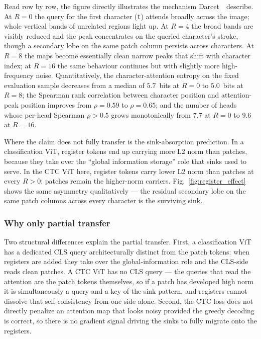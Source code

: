 Read row by row, the figure directly illustrates the mechanism Darcet~\etal\ describe. At $R = 0$ the query for the first character (\texttt{t}) attends broadly across the image; whole vertical bands of unrelated regions light up. At $R = 4$ the broad bands are visibly reduced and the peak concentrates on the queried character's stroke, though a secondary lobe on the same patch column persists across characters. At $R = 8$ the maps become essentially clean narrow peaks that shift with character index; at $R = 16$ the same behaviour continues but with slightly more high-frequency noise. Quantitatively, the character-attention entropy on the fixed evaluation sample decreases from a median of $5.7$~bits at $R = 0$ to $5.0$~bits at $R = 8$; the Spearman rank correlation between character position and attention-peak position improves from $\rho = 0.59$ to $\rho = 0.65$; and the number of heads whose per-head Spearman $\rho > 0.5$ grows monotonically from $7.7$ at $R = 0$ to $9.6$ at $R = 16$.

Where the claim does not fully transfer is the sink-absorption prediction. In a classification ViT, register tokens end up carrying more L2 norm than patches, because they take over the ``global information storage'' role that sinks used to serve. In the CTC ViT here, register tokens carry lower L2 norm than patches at every $R > 0$: patches remain the higher-norm carriers. Fig.~\ref{fig:register_effect} shows the same asymmetry qualitatively --- the residual secondary lobe on the same patch columns across every character is the surviving sink.

\subsubsection{Why only partial transfer}

Two structural differences explain the partial transfer. First, a classification ViT has a dedicated CLS query architecturally distinct from the patch tokens: when registers are added they take over the global-information role and the CLS-side reads clean patches. A CTC ViT has no CLS query --- the queries that read the attention are the patch tokens themselves, so if a patch has developed high norm it is simultaneously a query and a key of the sink pattern, and registers cannot dissolve that self-consistency from one side alone. Second, the CTC loss does not directly penalize an attention map that looks noisy provided the greedy decoding is correct, so there is no gradient signal driving the sinks to fully migrate onto the registers.

